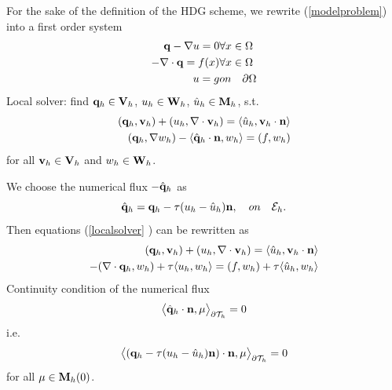 \documentclass[10pt,reqno, final]{amsart}
\begin{document}
For the sake of the definition of the HDG scheme, we rewrite (\ref{modelproblem}) into a first order system
\begin{eqnarray}
{\bf q}-\nabla u=0 & \forall x\in \Omega\nonumber\\
-\nabla\cdot{\bf q}=f(x) & \forall x\in \Omega\label{firstordersystem}\\
u=g & on\quad \partial\Omega\nonumber
\end{eqnarray}
Local solver: find ${\bf q}_h\in {\bf V}_h$, $u_h\in {\bf W}_h$, $\hat{u}_h\in {\bf M}_h$, s.t.
\begin{eqnarray}
\left({\bf q}_h, {\bf v}_h\right)+(u_h,\nabla\cdot{\bf v}_h)=\langle\hat{u}_h,{\bf v}_h\cdot{\bf n}\rangle\nonumber\\
({\bf q}_h,\nabla w_h)-\langle\hat{\bf q}_h\cdot{\bf n},w_h\rangle=(f,w_h)\label{localsolver}
\end{eqnarray}
for all ${\bf v}_h\in {\bf V}_h$ and $w_h\in {\bf W}_h$.


We choose the numerical flux $-\hat{\bf q}_h$ as
\begin{equation}
\label{numericalflux}
\hat{\bf q}_h={\bf q}_h-\tau(u_h-\hat{u}_h){\bf n}, \quad on\quad \mathcal{E}_h.
\end{equation}
Then equations (\ref{localsolver} ) can be rewritten as
\begin{eqnarray}
\left({\bf q}_h, {\bf v}_h\right)+(u_h,\nabla\cdot{\bf v}_h)=\langle\hat{u}_h,{\bf v}_h\cdot{\bf n}\rangle\nonumber\\
-(\nabla\cdot{\bf q}_h, w_h)+\tau\langle u_h, w_h\rangle=(f,w_h)+\tau\langle\hat{u}_h, w_h\rangle\label{localsolver1}
\end{eqnarray}
Continuity condition of the numerical flux
\begin{equation}\label{flux}
\big\langle\hat{\bf q}_h\cdot{\bf n}, \mu\big\rangle_{\partial\mathcal{T}_h}=0
\end{equation}
i.e.
\begin{equation}
\label{continuitycondition}
\big\langle ({\bf q}_h-\tau(u_h-\hat{u}_h){\bf n})\cdot{\bf n}, \mu\big\rangle_{\partial\mathcal{T}_h}=0
\end{equation}
for all $\mu\in{\bf M}_h(0)$.
\end{document}
